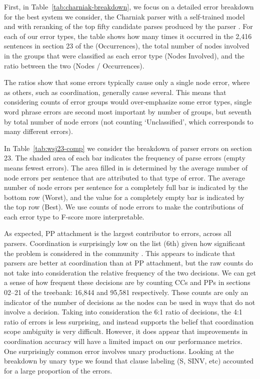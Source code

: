 First, in Table~\ref{tab:charniak-breakdown}, we focus on a detailed error breakdown for the best system we consider, the Charniak parser with a self-trained model and with reranking of the top fifty candidate parses produced by the parser \parencite{Charniak:2000,Charniak-Johnson:2005,McClosky-Charniak-Johnson:2006}.
For each of our error types, the table shows how many times it occurred in the 2,416 sentences in \wsj section 23 of the \ptb (Occurrences), the total number of nodes involved in the groups that were classified as each error type (Nodes Involved), and the ratio between the two (Nodes / Occurrences).

The ratios show that some errors typically cause only a single node error, where as others, such as coordination, generally cause several.
This means that considering counts of error groups would over-emphasize some error types, \myeg single word phrase errors are second most important by number of groups, but seventh by total number of node errors (not counting `Unclassified', which corresponds to many different errors).

In Table~\ref{tab:wsj23-comp} we consider the breakdown of parser errors on \wsj section 23.
The shaded area of each bar indicates the frequency of parse errors (\myie empty means fewest errors).
The area filled in is determined by the average number of node errors per sentence that are attributed to that type of error.
The average number of node errors per sentence for a completely full bar is indicated by the bottom row (Worst), and the value for a completely empty bar is indicated by the top row (Best).
We use counts of node errors to make the contributions of each error type to F-score more interpretable.

As expected, PP attachment is the largest contributor to errors, across all parsers.
Coordination is surprisingly low on the list (6th) given how significant the problem is considered in the community \parencite{N06-1020}.
This appears to indicate that parsers are better at coordination than at PP attachment, but the raw counts do not take into consideration the relative frequency of the two decisions.
We can get a sense of how frequent these decisions are by counting CCs and PPs in sections 02--21 of the treebank: 16,844 and 95,581 respectively.
These counts are only an indicator of the number of decisions as the nodes can be used in ways that do not involve a decision.
Taking into consideration the 6:1 ratio of decisions, the 4:1 ratio of errors is less surprising, and instead supports the belief that coordination scope ambiguity is very difficult.
However, it does appear that improvements in coordination accuracy will have a limited impact on our performance metrics.
One surprisingly common error involves unary productions.
Looking at the breakdown by unary type we found that clause labeling (S, SINV, etc) accounted for a large proportion of the errors.

